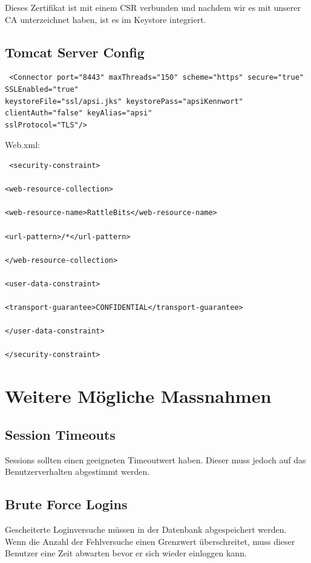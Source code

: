\documentclass[10pt]{scrartcl}
\begin{document}
Dieses Zertifikat ist mit einem CSR verbunden und nachdem wir es mit unserer CA unterzeichnet haben, ist es im Keystore integriert.

\subsection{Tomcat Server Config}
\begin{verbatim}
 <Connector port="8443" maxThreads="150" scheme="https" secure="true" SSLEnabled="true" 
keystoreFile="ssl/apsi.jks" keystorePass="apsiKennwort" clientAuth="false" keyAlias="apsi" 
sslProtocol="TLS"/>
\end{verbatim}

Web.xml: \\
\begin{verbatim}
 <security-constraint>

<web-resource-collection>

<web-resource-name>RattleBits</web-resource-name>

<url-pattern>/*</url-pattern>

</web-resource-collection>

<user-data-constraint>

<transport-guarantee>CONFIDENTIAL</transport-guarantee>

</user-data-constraint>

</security-constraint>
\end{verbatim}


\section{Weitere Mögliche Massnahmen}

\subsection{Session Timeouts}
Sessions sollten einen geeigneten Timeoutwert haben. Dieser muss jedoch auf das Benutzerverhalten abgestimmt werden.

\subsection{Brute Force Logins}
Gescheiterte Loginversuche müssen in der Datenbank abgespeichert werden. Wenn die Anzahl der Fehlversuche einen Grenzwert überschreitet, muss dieser Benutzer eine Zeit abwarten bevor er sich wieder einloggen kann. 
 
\end{document}
